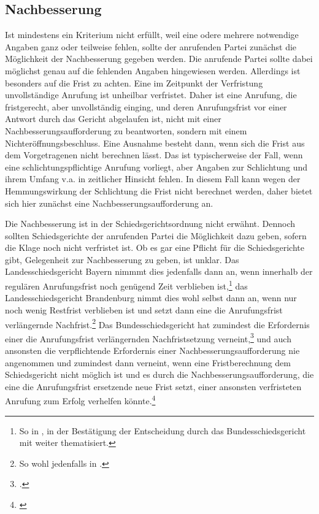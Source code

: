 \subsection{Nachbesserung}
\label{Anrufung:Beschluss:Nachbesserung}
Ist mindestens ein Kriterium nicht erfüllt, weil eine odere mehrere notwendige Angaben ganz oder teilweise fehlen, sollte der anrufenden Partei zunächst die Möglichkeit der Nachbesserung gegeben werden.
Die anrufende Partei sollte dabei möglichst genau auf die fehlenden Angaben hingewiesen werden.
Allerdings ist besonders auf die Frist zu achten.
Eine im Zeitpunkt der Verfristung unvollständige Anrufung ist unheilbar verfristet.
Daher ist eine Anrufung, die fristgerecht, aber unvollständig einging, und deren Anrufungsfrist vor einer Antwort durch das Gericht abgelaufen ist, nicht mit einer Nachbesserungsaufforderung zu beantworten, sondern mit einem Nichteröffnungsbeschluss.
Eine Ausnahme besteht dann, wenn sich die Frist aus dem Vorgetragenen nicht berechnen lässt.
Das ist typischerweise der Fall, wenn eine schlichtungspflichtige Anrufung vorliegt, aber Angaben zur Schlichtung und ihrem Umfang v.a. in zeitlicher Hinsicht fehlen.
In diesem Fall kann wegen der Hemmungswirkung der Schlichtung die Frist nicht berechnet werden, daher bietet sich hier zunächst eine Nachbesserungsaufforderung an.

Die Nachbesserung ist in der Schiedsgerichtsordnung nicht erwähnt.
Dennoch sollten Schiedsgerichte der anrufenden Partei die Möglichkeit dazu geben, sofern die Klage noch nicht verfristet ist.
Ob es gar eine Pflicht für die Schiedsgerichte gibt, Gelegenheit zur Nachbesserung zu geben, ist unklar.
Das Landesschiedsgericht Bayern nimmmt dies jedenfalls dann an, wenn innerhalb der regulären Anrufungsfrist noch genügend Zeit verblieben ist,\footnote{So in \cite[S.~2~f.]{LSGBYB413U}, in der Bestätigung der Entscheidung durch das Bundesschiedsgericht mit \cite{BSG314HA} weiter thematisiert.} das Landesschiedsgericht Brandenburg nimmt dies wohl selbst dann an, wenn nur noch wenig Restfrist verblieben ist und setzt dann eine die Anrufungsfrist verlängernde Nachfrist.\footnote{So wohl jedenfalls in \cites[S.~7]{LSGBB133}{LSGBB134}.}
Das Bundesschiedsgericht hat zumindest die Erfordernis einer die Anrufungsfrist verlängernden Nachfristsetzung verneint,\footnote{\cites[S.~2]{BSG2315HS}[S.~2]{BSG20130227}.} und auch ansonsten die verpflichtende Erfordernis einer Nachbesserungsaufforderung  nie angenommen und zumindest dann verneint, wenn eine Fristberechnung dem Schiedsgericht nicht möglich ist und es durch die Nachbesserungsaufforderung, die eine die Anrufungsfrist ersetzende neue Frist setzt, einer ansonsten verfristeten Anrufung zum Erfolg verhelfen könnte.\footnote{\cites{BSG3915HS}[S.~2]{BSG215HS}}

